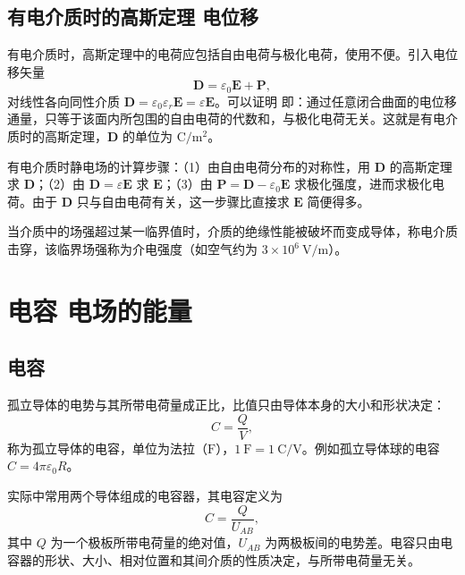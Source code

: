     \subsection{有电介质时的高斯定理 电位移}
    有电介质时，高斯定理中的电荷应包括自由电荷与极化电荷，使用不便。引入电位移矢量
    \[
    \boldsymbol{D}=\varepsilon_0\boldsymbol{E}+\boldsymbol{P},
    \]
    对线性各向同性介质 $\boldsymbol{D}=\varepsilon_0\varepsilon_r\boldsymbol{E}=\varepsilon\boldsymbol{E}$。可以证明
    即：通过任意闭合曲面的电位移通量，只等于该面内所包围的自由电荷的代数和，与极化电荷无关。这就是有电介质时的高斯定理，$\boldsymbol{D}$ 的单位为 $\mathrm{C/m^{2}}$。

    有电介质时静电场的计算步骤：（1）由自由电荷分布的对称性，用 $\boldsymbol{D}$ 的高斯定理求 $\boldsymbol{D}$；（2）由 $\boldsymbol{D}=\varepsilon\boldsymbol{E}$ 求 $\boldsymbol{E}$；（3）由 $\boldsymbol{P}=\boldsymbol{D}-\varepsilon_0\boldsymbol{E}$ 求极化强度，进而求极化电荷。由于 $\boldsymbol{D}$ 只与自由电荷有关，这一步骤比直接求 $\boldsymbol{E}$ 简便得多。

    当介质中的场强超过某一临界值时，介质的绝缘性能被破坏而变成导体，称电介质击穿，该临界场强称为介电强度（如空气约为 $3\times10^{6}\ \mathrm{V/m}$）。


\section{电容 电场的能量}
    \subsection{电容}
    孤立导体的电势与其所带电荷量成正比，比值只由导体本身的大小和形状决定：
    \[
    C=\frac{Q}{V},
    \]
    称为孤立导体的电容，单位为法拉（$\mathrm{F}$），$1\ \mathrm{F}=1\ \mathrm{C/V}$。例如孤立导体球的电容 $C=4\pi\varepsilon_0R$。

    实际中常用两个导体组成的电容器，其电容定义为
    \[
    C=\frac{Q}{U_{AB}},
    \]
    其中 $Q$ 为一个极板所带电荷量的绝对值，$U_{AB}$ 为两极板间的电势差。电容只由电容器的形状、大小、相对位置和其间介质的性质决定，与所带电荷量无关。

